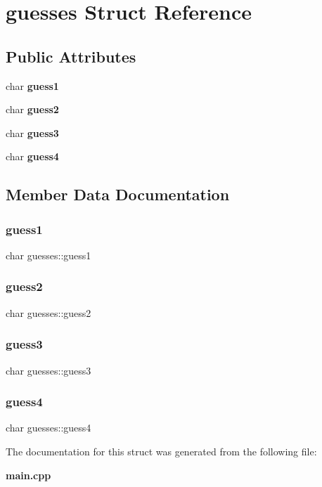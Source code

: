 \section{guesses Struct Reference}
\label{structguesses}
\subsection*{Public Attributes}
\begin{DoxyCompactItemize}
\item 
char \textbf{ guess1}
\item 
char \textbf{ guess2}
\item 
char \textbf{ guess3}
\item 
char \textbf{ guess4}
\end{DoxyCompactItemize}


\subsection{Member Data Documentation}
\mbox{\label{structguesses_afa2a3ddd28610b7b6f4ab7b75c946f90}} 
\subsubsection{guess1}
{\footnotesize\ttfamily char guesses\+::guess1}

\mbox{\label{structguesses_a472aabc670e71f1b284ae7626b27e7d0}} 
\subsubsection{guess2}
{\footnotesize\ttfamily char guesses\+::guess2}

\mbox{\label{structguesses_ad56cf9e77485cb3eb7208f06a776d11a}} 
\subsubsection{guess3}
{\footnotesize\ttfamily char guesses\+::guess3}

\mbox{\label{structguesses_a159aa898ae8532a0ad82eb8983b8e9e6}} 
\subsubsection{guess4}
{\footnotesize\ttfamily char guesses\+::guess4}



The documentation for this struct was generated from the following file\+:\begin{DoxyCompactItemize}
\item 
\textbf{ main.\+cpp}\end{DoxyCompactItemize}
